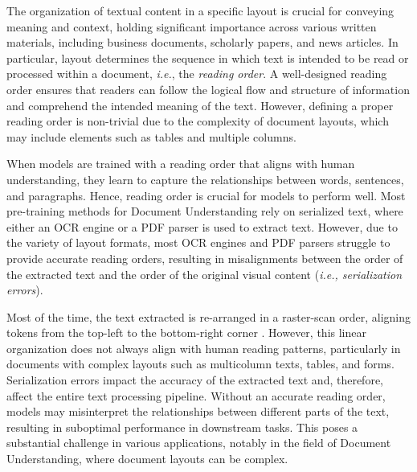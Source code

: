 
The organization of textual content in a specific layout is crucial for conveying meaning and context, holding significant importance across various written materials, including business documents, scholarly papers, and news articles. In particular, layout determines the sequence in which text is intended to be read or processed within a document, \textit{i.e.}, the \textit{reading order}. A well-designed reading order ensures that readers can follow the logical flow and structure of information and comprehend the intended meaning of the text. However, defining a proper reading order is non-trivial due to the complexity of document layouts, which may include elements such as tables and multiple columns.

When models are trained with a reading order that aligns with human understanding, they learn to capture the relationships between words, sentences, and paragraphs. Hence, reading order is crucial for models to perform well. Most pre-training methods for Document Understanding rely on serialized text, where either an \ac{OCR} engine or a PDF parser is used to extract text. However, due to the variety of layout formats, most \ac{OCR} engines and PDF parsers struggle to provide accurate reading orders, resulting in misalignments between the order of the extracted text and the order of the original visual content (\textit{i.e., serialization errors}). 

Most of the time, the text extracted is re-arranged in a raster-scan order, aligning tokens from the top-left to the bottom-right corner \citep{clausner2013significance}. However, this linear organization does not always align with human reading patterns, particularly in documents with complex layouts such as multicolumn texts, tables, and forms. Serialization errors impact the accuracy of the extracted text and, therefore, affect the entire text processing pipeline. Without an accurate reading order, models may misinterpret the relationships between different parts of the text, resulting in suboptimal performance in downstream tasks. This poses a substantial challenge in various applications, notably in the field of Document Understanding, where document layouts can be complex. 

